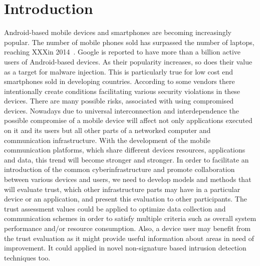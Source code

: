 \section{Introduction}

Android-based mobile devices and smartphones are becoming increasingly popular.  The number of mobile phones
sold has surpassed the number of laptops, reaching XXXin 2014~\cite{}.  Google is reported\cite{} to have more than
a billion active users of Android-based devices.  As their popularity increases, so does their value as
a target for malware injection.  
This is particularly true for low cost end smartphones sold in developing countries. According to \cite{}
some vendors there intentionally create conditions facilitating various security violations in these devices.
 There are many possible risks, associated with using compromised devices.  Nowadays due to universal interconnection and 
interdependence the 
possible compromise of a mobile device will affect not only applications executed on it and its users but all other parts 
of a networked computer and communication infrastructure.
With the development of the mobile communication platforms, which share different devices resources, applications and data, 
this trend will become stronger and stronger. 
In order to facilitate an introduction of the common cyberinfrastructure and promote collaboration between various devices 
and users, we need to develop models and methods that will evaluate trust, which other infrastructure parts may have in a 
particular device or an application, and present this evaluation to other participants. The trust assessment values could 
be applied to optimize data collection and communication schemes in order to satisfy multiple criteria such as overall 
system performance and/or resource consumption. Also, a device user may benefit from the trust evaluation as it might 
provide useful information about areas in need of improvement. It could applied in novel non-signature based intrusion 
detection techniques too.

